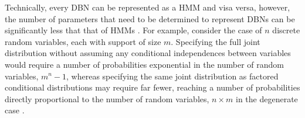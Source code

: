 Technically, every DBN can be represented as a HMM and visa versa, however, the number of parameters that need to be determined to represent DBNs can be significantly less that that of HMMs \cite{KollerPGM}. For example, consider the case of $n$ discrete random variables, each with support of size $m$. Specifying the full joint distribution without assuming any conditional independences between variables would require a number of probabilities exponential in the number of random variables, $m^{n}-1$, whereas specifying the same joint distribution as factored conditional distributions may require far fewer, reaching a number of probabilities directly proportional to the number of random variables, $n \times m$ in the degenerate case \cite[p~.63]{KollerPGM}. 

